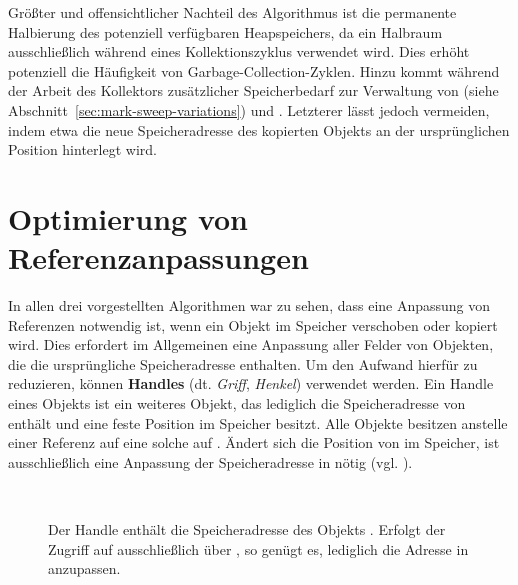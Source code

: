 Größter und offensichtlicher Nachteil des Algorithmus ist die permanente Halbierung des potenziell verfügbaren Heapspeichers, da ein Halbraum ausschließlich während eines Kollektionszyklus verwendet wird.
Dies erhöht potenziell die Häufigkeit von Garbage-Collection-Zyklen.
Hinzu kommt während der Arbeit des Kollektors zusätzlicher Speicherbedarf zur Verwaltung von  (siehe Abschnitt~\ref{sec:mark-sweep-variations}) und .
Letzterer lässt jedoch vermeiden, indem etwa die neue Speicheradresse des kopierten Objekts an der ursprünglichen Position hinterlegt wird.




\section{Optimierung von Referenzanpassungen}
\label{sec:handle}
In allen drei vorgestellten Algorithmen war zu sehen, dass eine Anpassung von Referenzen notwendig ist, wenn ein Objekt im Speicher verschoben oder kopiert wird.
Dies erfordert im Allgemeinen eine Anpassung aller Felder von Objekten, die die ursprüngliche Speicheradresse enthalten.
Um den Aufwand hierfür zu reduzieren, können \textbf{Handles} (dt. \textit{Griff}, \textit{Henkel}) verwendet werden.
Ein Handle  eines Objekts  ist ein weiteres Objekt, das lediglich die Speicheradresse von  enthält und eine feste Position im Speicher besitzt.
Alle Objekte besitzen anstelle einer Referenz auf  eine solche auf .
Ändert sich die Position von  im Speicher, ist ausschließlich eine Anpassung der Speicheradresse in  nötig (vgl. \cite{brooks1984}).

\begin{figure}[h]
	\centering
	~\hspace{1cm}~
	
	\caption[Handle zur indirekten Adressierung von Objekten]{Der Handle  enthält die Speicheradresse des Objekts . Erfolgt der Zugriff auf  ausschließlich über , so genügt es, lediglich die Adresse in  anzupassen.}
	\label{fig:handle}
\end{figure}

